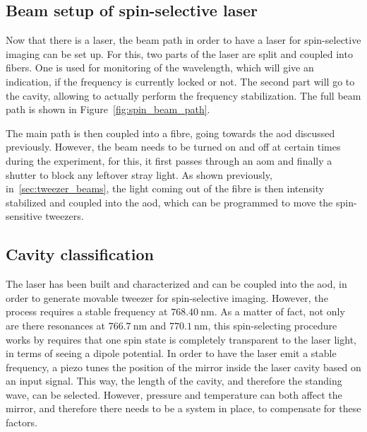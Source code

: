 \subsection{Beam setup of spin-selective laser}

Now that there is a laser, the beam path in order to have a laser for spin-selective imaging can be set up. For this, two parts of the laser are split and coupled into fibers. One is used for monitoring of the wavelength, which will give an indication, if the frequency is currently locked or not. The second part will go to the cavity, allowing to actually perform the frequency stabilization. The full beam path is shown in Figure~\ref{fig:spin_beam_path}.

\begin{figure}[t]%
\end{figure}

The main path is then coupled into a fibre, going towards the \ac{aod} discussed previously. However, the beam needs to be turned on and off at certain times during the experiment, for this, it first passes through an \ac{aom} and finally a shutter to block any leftover stray light. As shown previously, in~\ref{sec:tweezer_beams}, the light coming out of the fibre is then intensity stabilized and coupled into the \ac{aod}, which can be programmed to move the spin-sensitive tweezers.

\subsection{Cavity classification}

The laser has been built and characterized and can be coupled into the \ac{aod}, in order to generate movable tweezer for spin-selective imaging. However, the process requires a stable frequency at $\SI{768.40}{\nano\meter}$. As a matter of fact, not only are there resonances at $\SI{766.7}{\nano\meter}$ and $\SI{770.1}{\nano\meter}$, this spin-selecting procedure works by requires that one spin state is completely transparent to the laser light, in terms of seeing a dipole potential. In order to have the laser emit a stable frequency, a piezo tunes the position of the mirror inside the laser cavity based on an input signal. This way, the length of the cavity, and therefore the standing wave, can be selected. However, pressure and temperature can both affect the mirror, and therefore there needs to be a system in place, to compensate for these factors.

